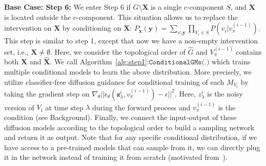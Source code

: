 \documentclass{article}
\newcommand{\red}{\textcolor{red}}
\newcommand{\x}{\mathbf{x}}
\newcommand{\y}{\mathbf{y}}
\newcommand{\X}{\mathbf{X}}
\newcommand{\Xp}{{\hat{\mathbf{X}}}}
\newcommand{\Gp}{{\hat{{G}}}}
\newcommand{\Y}{\mathbf{Y}}
\newcommand{\mbf}{\mathbf}
\newcommand{\condgm}{\texttt{ConditionalGMs(.)}\xspace}
\theoremstyle{plain}
\theoremstyle{definition}
\theoremstyle{remark}
\begin{document}
\textbf{Base Case: Step 6:}
We enter Step 6 if $G\setminus \X$  is a single c-component $S$, and $\X$ is located outside the c-component.
This situation allows us to replace the intervention on $\X$ by conditioning on $\X$: $P_{\x}(\y) = \sum_{{s} \setminus \y} \prod_{V_i\in S} P(v_i| v_{\pi}^{(i-1)})$.
This step is similar to step 1, except that now we have a non-empty intervention set, i.e., $\X \neq \emptyset$. Here, we
consider the topological order of $\Gp$ 
and $V_{\pi}^{(i-1)}$ contains both $\X$ and $\Xp$.
We call Algorithm~\ref{alg:step1}:$\mathrm{\condgm}$ which trains multiple conditional models to learn the above distribution. More precisely, we utilize classifier-free diffusion guidance for conditional training of each $M_{V_i}$ by taking the gradient step on $\nabla_{\theta} || \epsilon_{\theta}(\mbf{z}^{i}_{\lambda},v_{\pi}^{(i-1)})-\epsilon||^2$.
Here, $z^{i}_{\lambda}$ is the noisy version of $V_i$ at time step $\lambda$ during the forward process and $v_{\pi}^{(i-1)}$ is the condition (see Background).
Finally, we connect the input-output of these diffusion models according to the topological order to build a sampling network and return it as output.
Note that for any specific conditional distribution, if we have access to a pre-trained models that can sample from it, we can directly plug it in the network instead of training it from scratch (motivated from~\cite{rahman2024modular}).
%
%
\end{document}
